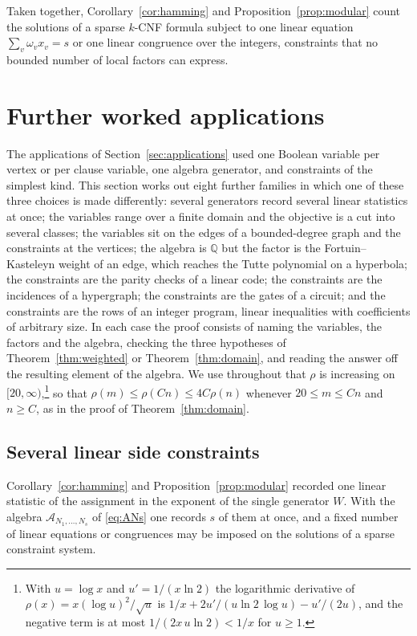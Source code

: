 \documentclass[11pt,reqno]{amsart}
\numberwithin{equation}{section}
\theoremstyle{plain}
\theoremstyle{definition}
\theoremstyle{remark}
\newcommand{\A}{\mathcal{A}}
\newcommand{\Q}{\mathbb{Q}}
\newcommand{\rhon}{\rho}
\begin{document}
Taken together, Corollary~\ref{cor:hamming} and Proposition~\ref{prop:modular}
count the solutions of a sparse $k$-CNF formula subject to one linear equation
$\sum_v\omega_vx_v=s$ or one linear congruence over the integers, constraints
that no bounded number of local factors can express.

\section{Further worked applications}\label{sec:more}\enlargethispage{4pt}

The applications of Section~\ref{sec:applications} used one Boolean variable
per vertex or per clause variable, one algebra generator, and constraints of the
simplest kind. This section works out eight further families in which one of
these three choices is made differently: several generators record several
linear statistics at once; the variables range over a finite domain and the
objective is a cut into several classes; the variables sit on the edges of a
bounded-degree graph and the constraints at the vertices; the algebra is $\Q$
but the factor is the Fortuin--Kasteleyn weight of an edge, which reaches the
Tutte polynomial on a hyperbola; the constraints are the parity checks of a
linear code; the constraints are the incidences of a hypergraph; the
constraints are the gates of a circuit; and the constraints are the rows of
an integer program, linear inequalities with coefficients of arbitrary size. In each case the proof consists of
naming the variables, the factors and the algebra, checking the three
hypotheses of Theorem~\ref{thm:weighted} or Theorem~\ref{thm:domain}, and
reading the answer off the resulting element of the algebra. We use throughout
that $\rhon$ is increasing on $[20,\infty)$,\footnote{With $u=\log x$ and
$u'=1/(x\ln 2)$ the logarithmic derivative of $\rhon(x)=x(\log u)^2/\sqrt u$ is
$1/x+2u'/(u\ln 2\,\log u)-u'/(2u)$, and the negative term is at most
$1/(2x\,u\ln 2)<1/x$ for $u\ge 1$.} so that $\rhon(m)\le\rhon(Cn)\le 4C\rhon(n)$
whenever $20\le m\le Cn$ and $n\ge C$, as in the proof of
Theorem~\ref{thm:domain}.

\subsection{Several linear side constraints}\label{ssec:linear}
Corollary~\ref{cor:hamming} and Proposition~\ref{prop:modular} recorded one
linear statistic of the assignment in the exponent of the single generator $W$.
With the algebra $\A_{N_1,\dots,N_s}$ of \eqref{eq:ANs} one records $s$ of them
at once, and a fixed number of linear equations or congruences may be imposed
on the solutions of a sparse constraint system.
\end{document}
